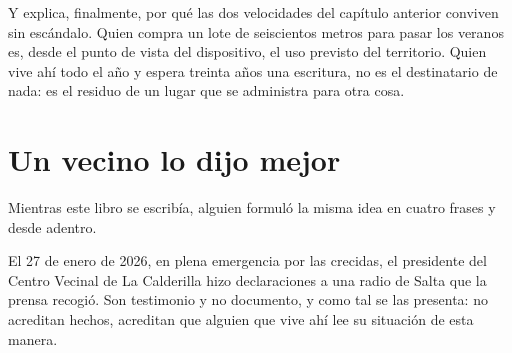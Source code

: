 Y explica, finalmente, por qué las dos velocidades del capítulo anterior conviven sin
escándalo. Quien compra un lote de seiscientos metros para pasar los veranos es, desde el
punto de vista del dispositivo, el uso previsto del territorio. Quien vive ahí todo el año y
espera treinta años una escritura, no es el destinatario de nada: es el residuo de un lugar
que se administra para otra cosa.

\section{Un vecino lo dijo mejor}

Mientras este libro se escribía, alguien formuló la misma idea en cuatro frases y desde
adentro.

El 27 de enero de 2026, en plena emergencia por las crecidas, el presidente del Centro
Vecinal de La Calderilla hizo declaraciones a una radio de Salta que la prensa recogió. Son
testimonio y no documento, y como tal se las presenta: no acreditan hechos, acreditan que
alguien que vive ahí lee su situación de esta manera.

